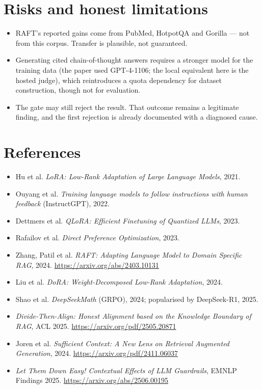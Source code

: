 \documentclass[11pt,a4paper]{article}
\begin{document}
\section{Risks and honest limitations}

\begin{itemize}[leftmargin=1.2em,itemsep=2pt]
  \item RAFT's reported gains come from PubMed, HotpotQA and Gorilla --- not from this corpus.
        Transfer is plausible, not guaranteed.
  \item Generating cited chain-of-thought answers requires a stronger model for the training data
        (the paper used GPT-4-1106; the local equivalent here is the hosted judge), which reintroduces
        a quota dependency for dataset construction, though not for evaluation.
  \item The gate may still reject the result. That outcome remains a legitimate finding, and the
        first rejection is already documented with a diagnosed cause.
\end{itemize}

\section*{References}
\small
\begin{itemize}[leftmargin=1.2em,itemsep=1pt]
  \item Hu et al. \textit{LoRA: Low-Rank Adaptation of Large Language Models}, 2021.
  \item Ouyang et al. \textit{Training language models to follow instructions with human feedback} (InstructGPT), 2022.
  \item Dettmers et al. \textit{QLoRA: Efficient Finetuning of Quantized LLMs}, 2023.
  \item Rafailov et al. \textit{Direct Preference Optimization}, 2023.
  \item Zhang, Patil et al. \textit{RAFT: Adapting Language Model to Domain Specific RAG}, 2024. \url{https://arxiv.org/abs/2403.10131}
  \item Liu et al. \textit{DoRA: Weight-Decomposed Low-Rank Adaptation}, 2024.
  \item Shao et al. \textit{DeepSeekMath} (GRPO), 2024; popularised by DeepSeek-R1, 2025.
  \item \textit{Divide-Then-Align: Honest Alignment based on the Knowledge Boundary of RAG}, ACL 2025. \url{https://arxiv.org/pdf/2505.20871}
  \item Joren et al. \textit{Sufficient Context: A New Lens on Retrieval Augmented Generation}, 2024. \url{https://arxiv.org/pdf/2411.06037}
  \item \textit{Let Them Down Easy! Contextual Effects of LLM Guardrails}, EMNLP Findings 2025. \url{https://arxiv.org/abs/2506.00195}
\end{itemize}
\end{document}
